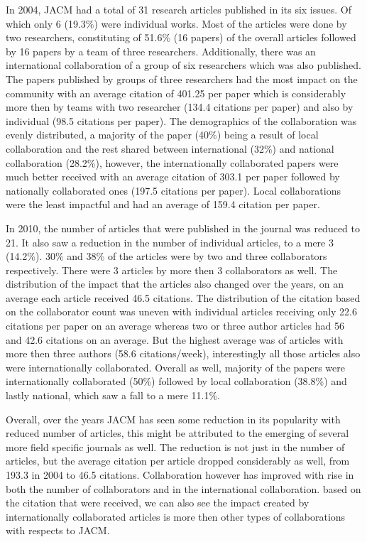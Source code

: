 \documentclass[12pt]{article}
\begin{document}
In 2004, JACM had a total of 31 research articles published in its six issues. Of which only 6 (19.3\%) were individual works. Most of the articles were done by two researchers, constituting of 51.6\% (16 papers) of the overall articles followed by 16 papers by a team of three researchers. Additionally, there was an international collaboration of a group of six researchers which was also published. The papers published by groups of three researchers had the most impact on the community with an average citation of 401.25 per paper which is considerably more then by teams with two researcher (134.4 citations per paper) and also by individual (98.5 citations per paper). The demographics of the collaboration was evenly distributed, a majority of the paper (40\%) being a result of local collaboration and the rest shared between international (32\%) and national collaboration (28.2\%), however, the internationally collaborated papers were much better received with an average citation of 303.1 per paper followed by nationally collaborated ones (197.5 citations per paper). Local collaborations were the least impactful and had an average of 159.4 citation per paper.

In 2010, the number of articles that were published in the journal was reduced to 21. It also saw a reduction in the number of individual articles, to a mere 3 (14.2\%). 30\% and 38\% of the articles were by two and three collaborators respectively. There were 3 articles by more then 3 collaborators as well. The distribution of the impact that the articles also changed over the years, on an average each article received 46.5 citations. The distribution of the citation based on the collaborator count was uneven with individual articles receiving only 22.6 citations per paper on an average whereas two or three author articles had 56 and 42.6 citations on an average. But the highest average was of articles with more then three authors (58.6 citations/week), interestingly all those articles also were internationally collaborated. Overall as well, majority of the papers were internationally collaborated (50\%) followed by local collaboration (38.8\%) and lastly national, which saw a fall to a mere 11.1\%.


Overall, over the years JACM has seen some reduction in its popularity with reduced number of articles, this might be attributed to the emerging of several more field specific journals as well. The reduction is not just in the number of articles, but the average citation per article dropped considerably as well, from 193.3 in 2004 to 46.5 citations. Collaboration however has improved with rise in both the number of collaborators and in the international collaboration. based on the citation that were received, we can also see the impact created by internationally collaborated articles is more then other types of collaborations with respects to JACM.
\end{document}
